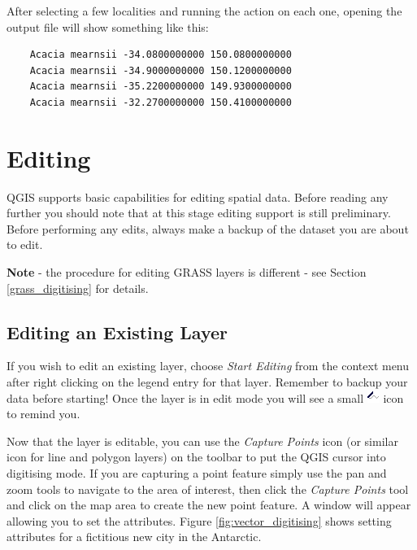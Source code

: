 After selecting a few localities and running the action on each one, opening the output file will show something like this:

\begin{verbatim}
	Acacia mearnsii -34.0800000000 150.0800000000
	Acacia mearnsii -34.9000000000 150.1200000000
	Acacia mearnsii -35.2200000000 149.9300000000
	Acacia mearnsii -32.2700000000 150.4100000000
\end{verbatim} 


\section{Editing}

QGIS supports basic capabilities for editing spatial data.  Before reading any
further you should note that at this stage editing support is still preliminary.
Before performing any edits, always make a backup of the dataset you are about
to edit. 

\textbf{Note} - the procedure for editing GRASS layers is different - see
Section \ref{grass_digitising} for details.

\subsection{Editing an Existing Layer}
\label{sec:edit_existing_layer}
If you wish to edit an existing layer, choose \textit{Start Editing} from the
context menu after right clicking on the legend entry for that layer. Remember
to backup your data before starting! Once the layer is in edit mode you will
see a small \includegraphics[scale=1]{qgis_user_guide_images/editable} icon to
remind you.

Now that the layer is editable, you can use the \textit{Capture Points} icon (or
similar icon for line and polygon layers) on the toolbar to put the QGIS cursor
into digitising mode. If you are capturing a point feature simply use the pan
and zoom tools to navigate to the area of interest, then click the
\textit{Capture Points} tool and click on the map area to create the  
new point feature. A window will appear allowing you to set the attributes.
Figure \ref{fig:vector_digitising} shows setting attributes for a fictitious
new city in the Antarctic.

